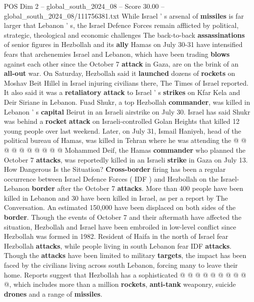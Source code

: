 \begin{textsample}{POS Dim 2 – global\_south\_2024\_08 – Score 30.00 – global\_south\_2024\_08/111756381.txt}  \label{ex:f2_pos_012}
While Israel ' s arsenal of \textbf{missiles} is far larger that Lebanon ' s, the Israel Defence Forces remain afflicted by political, strategic, theological and economic challenges The back-to-back \textbf{assassinations} of senior figures in Hezbollah and its \textbf{ally} Hamas on July 30-31 have intensified fears that archenemies Israel and Lebanon, which have been trading \textbf{blows} against each other since the October 7 \textbf{attack} in Gaza, are on the brink of an \textbf{all-out} war.
On Saturday, Hezbollah said it \textbf{launched} dozens of \textbf{rockets} on Moshav Beit Hillel in Israel injuring civilians there, The Times of Israel reported.
It also said it was a \textbf{retaliatory} \textbf{attack} to Israel ' s \textbf{strikes} on Kfar Kela and Deir Siriane in Lebanon.
Fuad Shukr, a top Hezbollah \textbf{commander}, was killed in Lebanon ' s \textbf{capital} Beirut in an Israeli airstrike on July 30.
Israel has said Shukr was behind a \textbf{rocket} \textbf{attack} on Israeli-controlled Golan Heights that killed 12 young people over last weekend.
Later, on July 31, Ismail Haniyeh, head of the political bureau of Hamas, was killed in Tehran where he was attending the @ @ @ @ @ @ @ @ @ @ Mohammed Deif, the Hamas \textbf{commander} who planned the October 7 \textbf{attacks}, was reportedly killed in an Israeli \textbf{strike} in Gaza on July 13.
How Dangerous Is the Situation? \textbf{Cross-border} firing has been a regular occurrence between Israel Defence Forces ( IDF ) and Hezbollah on the Israel-Lebanon \textbf{border} after the October 7 \textbf{attacks}.
More than 400 people have been killed in Lebanon and 30 have been killed in Israel, as per a report by The Conversation.
An estimated 150,000 have been displaced on both sides of the \textbf{border}.
Though the events of October 7 and their aftermath have affected the situation, Hezbollah and Israel have been embroiled in low-level conflict since Hezbollah was formed in 1982.
Resident of Haifa in the north of Israel fear Hezbollah \textbf{attacks}, while people living in south Lebanon fear IDF \textbf{attacks}.
Though the \textbf{attacks} have been limited to military \textbf{targets}, the impact has been faced by the civilians living across south Lebanon, forcing many to leave their home.
Reports suggest that Hezbollah has a sophisticated @ @ @ @ @ @ @ @ @ @, which includes more than a million \textbf{rockets}, \textbf{anti-tank} weaponry, suicide \textbf{drones} and a range of \textbf{missiles}.

\end{textsample}

